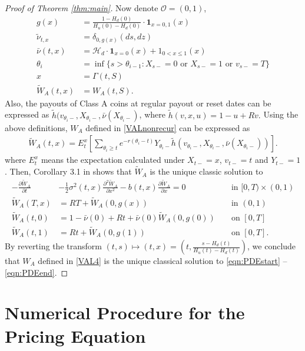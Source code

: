 \documentclass[draft, noinfoline]{ectaart}
\numberwithin{equation}{section}
\theoremstyle{plain}
\newcommand{\der}[2]{\ensuremath{\frac{\partial #1}{\partial #2}}}
\newcommand{\dder}[2]{\ensuremath{\frac{\partial^2 #1}{\partial #2^2}}}
\begin{document}
\begin{appendices}
\begin{proof}[Proof of Theorem \ref{thm:main}]
	Now denote $\mathcal{O}=(0,1)$,
	\begin{align*}
		g(x)&=\frac{1-H_d(0)}{H_u(0)-H_d(0)}\cdot\mathbf{1}_{x=0,1}(x)\\
		\tilde{\nu}_{t,x}&=\delta_{0,g(x)}(ds,dz)\\
		\bar{\nu}(t,x)&=\mathcal{H}_d\cdot \mathbf{1}_{x=0}(x)+1_{0<x\le 1}(x)\\
		\theta_i&=\inf\{s>\theta_{i-1}:X_{s-}=0\text{ or }X_{s-}=1\text{ or }v_{s-}=T\}\\
		x&=\Gamma(t,S)\\
		\tilde{W}_A(t,x)&=W_A(t,S).
	\end{align*}
	Also, the payouts of Class A coins at regular payout or reset dates can be expressed as $\tilde{h}(v_{\theta_i-},X_{\theta_i-},\bar{\nu}(X_{\theta_i-})$, where
	$\tilde{h}(v,x,u)=1-u+Rv.$
	Using the above definitions, $W_A$ defined in \eqref{VALnonrecur} can be expressed as
	\begin{align*}
		\tilde{W}_A(t,x)=E_t^x\left[\sum_{\theta_i\ge t}e^{-r(\theta_i-t)}Y_{\theta_i-}\tilde{h}(v_{\theta_i-},X_{\theta_i-},\bar{\nu}(X_{\theta_i-}))\right].
	\end{align*}
	where $E_t^x$ means the expectation calculated under $X_{t-}=x$, $v_{t-}=t$ and $Y_{t-}=1$. Then, Corollary 3.1 in \cite{dai_stochastic_2017} shows that $\tilde{W}_A$ is the unique classic solution to
	\begin{align}\label{eqn:transformedPDEstart}
		-\der{\tilde{W}_A}{t}&-\frac{1}{2}\sigma^2(t,x)\dder{\tilde{W}_A}{x}-b(t,x)\der{\tilde{W}_A}{x}=0 && \text{ in }[0,T)\times(0,1)\\
		\tilde{W}_A(T,x)&=RT+\tilde{W}_A(0,g(x)) && \text{ in }(0,1)\\
		\tilde{W}_A(t,0)&=1-\bar{\nu}(0)+Rt+\bar{\nu}(0)\tilde{W}_A(0,g(0)) && \text{ on }[0,T]\\ \label{eqn:transformedPDEend}
		\tilde{W}_A(t,1)&=Rt+\tilde{W}_A(0,g(1)) && \text{ on }[0,T].
	\end{align}
	By reverting the transform $(t,s)\mapsto(t,x)=\left(t,\frac{s-H_d(t)}{H_u(t)-H_d(t)}\right)$, we conclude that $W_A$ defined in \eqref{VAL4} is the unique classical solution to \eqref{eqn:PDEstart} -- \eqref{eqn:PDEend}.
\end{proof}

\section{Numerical Procedure for the Pricing Equation}\label{subsec:Numerical-Procedure-for}


\end{appendices}
\end{document}
